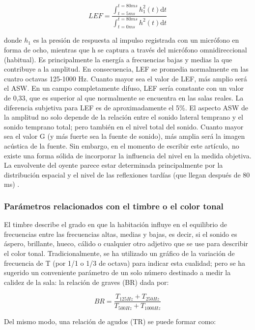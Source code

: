 \begin{equation}
LEF = \frac{\int_{t=5ms}^{t=80ms} h^2_1(t) \mathrm{d}t}{\int_{t=0ms}^{t=80ms} h^2(t) \mathrm{d}t}
\end{equation}

donde $h_1$ es la presión de respuesta al impulso registrada con un micrófono en forma de ocho, mientras que h se captura a través del micrófono omnidireccional (habitual). Es principalmente la energía a frecuencias bajas y medias la que contribuye a la amplitud. En consecuencia, LEF se promedia normalmente en las cuatro octavas 125-1000 Hz. Cuanto mayor sea el valor de LEF, más amplio será el ASW. En un campo completamente difuso, LEF sería constante con 
un valor de 0,33, que es superior al que normalmente se encuentra en las salas reales. La diferencia subjetiva para LEF es de aproximadamente el 5\%. El aspecto ASW de la amplitud no solo depende de la relación entre el sonido lateral temprano y el sonido temprano total; pero también en el nivel total del sonido. Cuanto mayor sea el valor G (y más fuerte sea la fuente de sonido), más amplia será la imagen acústica de la fuente. Sin embargo, en el momento de escribir este artículo, no existe una forma sólida de incorporar la influencia del nivel en la medida objetiva. La envolvente del oyente parece estar determinada principalmente por la distribución espacial y el nivel de las reflexiones tardías (que llegan después de 80 ms) \cite{Rossing2007}.

\subsubsection{Parámetros relacionados con el timbre o el color tonal} El timbre describe el grado en que la habitación influye en el equilibrio de frecuencias entre las frecuencias altas, medias y bajas, es decir, si el sonido es áspero, brillante, hueco, cálido o cualquier otro adjetivo que se use para describir el color tonal. Tradicionalmente, se ha utilizado un gráfico de la variación de frecuencia de T (por 1/1 o 1/3 de octava) para indicar esta cualidad; pero se ha sugerido un conveniente parámetro de un solo número destinado a medir la calidez de la sala: la relación de graves (BR) dada por:

\begin{equation}
BR = \frac{T_{125Hz}+T_{250Hz}}{T_{500Hz}+T_{1000Hz}}
\end{equation}

Del mismo modo, una relación de agudos (TR) se puede formar como:

